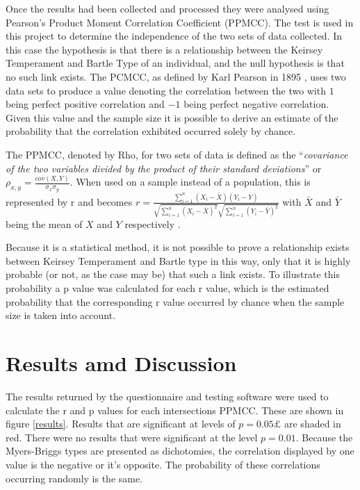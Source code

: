 \documentclass[12pt,a4paper,twoside]{report}
\begin{document}
Once the results had been collected and processed they were analysed using Pearson's Product Moment Correlation Coefficient (PPMCC). The test is used in this project to determine the independence of the two sets of data collected. In this case the hypothesis is that there is a relationship between the Keirsey Temperament and Bartle Type of an individual, and the null hypothesis is that no such link exists. The PCMCC, as defined by Karl Pearson in 1895 \cite{pearson1895note}, uses two data sets to produce a value denoting the correlation between the two with $1$ being perfect positive correlation and $-1$ being perfect negative correlation. Given this value and the sample size it is possible to derive an estimate of the probability that the correlation exhibited occurred solely by chance. 

The PPMCC, denoted by Rho, for two sets of data is defined as the ``\textit{covariance of the two variables divided by the product of their standard deviations}'' \cite{wiki-ppmcc} or $\rho_{x,y}=\frac{cov(X,Y)}{\sigma_x \sigma_y}$. When used on a sample instead of a population, this is represented by r and becomes $r=\frac{\sum_{i=1}^{n}(X_i-\bar{X})(Y_i-\bar{Y})}{\sqrt{\sum_{i=1}^{n}(X_i-\bar{X})^2}\sqrt{\sum_{i=1}^{n}(Y_i-\bar{Y})^2}}$ with $\bar{X}$ and $\bar{Y}$ being the mean of $X$ and $Y$ respectively \cite{pearson1895note}. 

\vspace{0.1cm}
Because it is a statistical method, it is not possible to prove a relationship exists between Keirsey Temperament and Bartle type in this way, only that it is highly probable (or not, as the case may be) that such a link exists. To illustrate this probability a p value was calculated for each r value, which is the estimated probability that the corresponding r value occurred by chance when the sample size is taken into account.

\section{Results amd Discussion}
The results returned by the questionnaire and testing software were used to calculate the r and p values for each intersections PPMCC. These are shown in figure \ref{results}. Results that are significant at levels of $p = 0.05£$ are shaded in red. There were no results that were significant at the level $p = 0.01$. Because the Myers-Briggs types are presented as dichotomies, the correlation displayed by one value is the negative or it's opposite. The probability of these correlations occurring randomly is the same.
\end{document}
